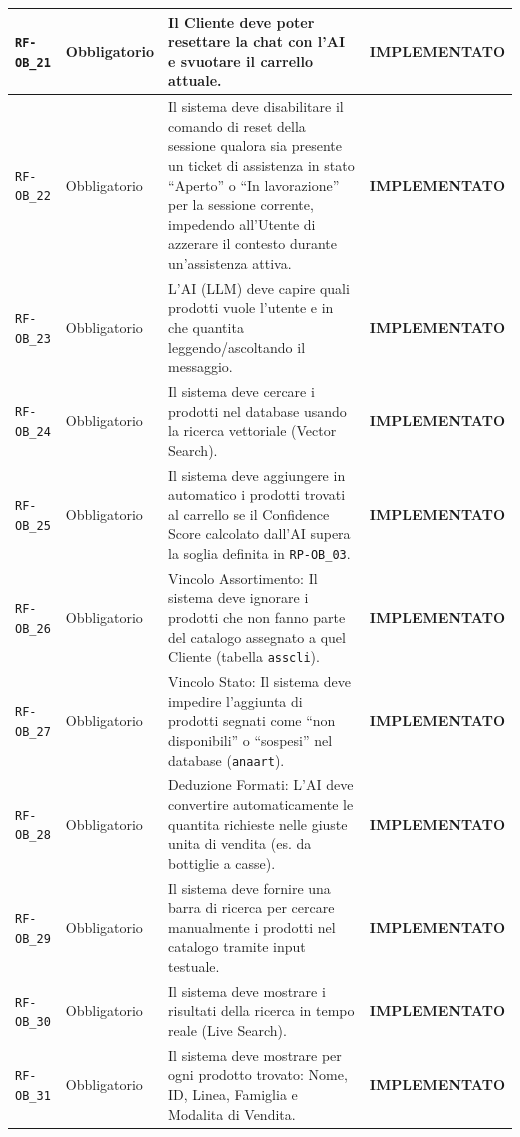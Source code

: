 \documentclass[a4paper, 11pt, oneside]{scrartcl}
\begin{document}
\begin{longtable}{|>{\raggedright\arraybackslash}p{}|>{\raggedright\arraybackslash}p{}|>{\raggedright\arraybackslash}p{}|>{\raggedright\arraybackslash}p{}|}
    \hline
    \texttt{RF-OB\_21} & Obbligatorio & Il Cliente deve poter resettare la chat con l'AI e svuotare il carrello attuale. & \textbf{IMPLEMENTATO} \\
    \hline
    \texttt{RF-OB\_22} & Obbligatorio & Il sistema deve disabilitare il comando di reset della sessione qualora sia presente un ticket di assistenza in stato ``Aperto'' o ``In lavorazione'' per la sessione corrente, impedendo all'Utente di azzerare il contesto durante un'assistenza attiva. & \textbf{IMPLEMENTATO} \\
    \hline
    \texttt{RF-OB\_23} & Obbligatorio & L'AI (LLM) deve capire quali prodotti vuole l'utente e in che quantita leggendo/ascoltando il messaggio. & \textbf{IMPLEMENTATO} \\
    \hline
    \texttt{RF-OB\_24} & Obbligatorio & Il sistema deve cercare i prodotti nel database usando la ricerca vettoriale (Vector Search). & \textbf{IMPLEMENTATO} \\
    \hline
    \texttt{RF-OB\_25} & Obbligatorio & Il sistema deve aggiungere in automatico i prodotti trovati al carrello se il Confidence Score calcolato dall'AI supera la soglia definita in \texttt{RP-OB\_03}. & \textbf{IMPLEMENTATO} \\
    \hline
    \texttt{RF-OB\_26} & Obbligatorio & Vincolo Assortimento: Il sistema deve ignorare i prodotti che non fanno parte del catalogo assegnato a quel Cliente (tabella \texttt{asscli}). & \textbf{IMPLEMENTATO} \\
    \hline
    \texttt{RF-OB\_27} & Obbligatorio & Vincolo Stato: Il sistema deve impedire l'aggiunta di prodotti segnati come ``non disponibili'' o ``sospesi'' nel database (\texttt{anaart}). & \textbf{IMPLEMENTATO} \\
    \hline
    \texttt{RF-OB\_28} & Obbligatorio & Deduzione Formati: L'AI deve convertire automaticamente le quantita richieste nelle giuste unita di vendita (es. da bottiglie a casse). & \textbf{IMPLEMENTATO} \\
    \hline
    \texttt{RF-OB\_29} & Obbligatorio & Il sistema deve fornire una barra di ricerca per cercare manualmente i prodotti nel catalogo tramite input testuale. & \textbf{IMPLEMENTATO} \\
    \hline
    \texttt{RF-OB\_30} & Obbligatorio & Il sistema deve mostrare i risultati della ricerca in tempo reale (Live Search). & \textbf{IMPLEMENTATO} \\
    \hline
    \texttt{RF-OB\_31} & Obbligatorio & Il sistema deve mostrare per ogni prodotto trovato: Nome, ID, Linea, Famiglia e Modalita di Vendita. & \textbf{IMPLEMENTATO} \\

\end{longtable}
\end{document}
